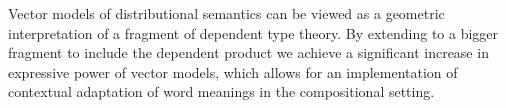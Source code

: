 Vector models of distributional semantics can be viewed as a geometric interpretation of a fragment of dependent type theory. By extending to a bigger fragment to include the dependent product we achieve a significant increase in expressive power of vector models, which allows for an implementation of contextual adaptation of word meanings in the compositional setting.
